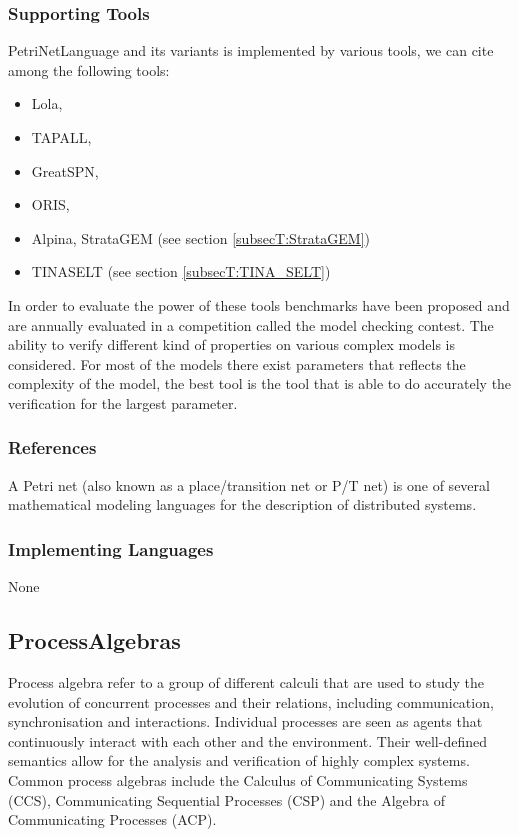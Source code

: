 \subsubsection{Supporting Tools}

PetriNetLanguage and its variants is implemented by various tools, we can cite among the following tools:
\begin{itemize}
	\item Lola,
	\item TAPALL,
	\item GreatSPN,
	\item ORIS,
	\item Alpina, StrataGEM (see section \ref{subsecT:StrataGEM})
	\item TINA\textunderscore SELT (see section \ref{subsecT:TINA_SELT})
\end{itemize}

In order to evaluate the power of these tools benchmarks have been proposed and are annually evaluated in a competition called the model checking contest. \cite{mcc} The ability to verify different kind of properties on various complex models is considered. 
For most of the models there exist parameters that reflects the complexity of the model, the best tool is the tool that is
able to do accurately the verification for the largest parameter.

\subsubsection{References}

A Petri net (also known as a place/transition net or P/T net) is one of several mathematical modeling languages for the description of distributed systems.

\subsubsection{Implementing Languages}

None

\subsection{ProcessAlgebras}
\label{subsecF:ProcessAlgebras}

Process algebra refer to a group of different calculi that are used to study the evolution of concurrent processes and their relations, including communication, synchronisation and interactions.
Individual processes are seen as agents that continuously interact with each other and the environment.
Their well-defined semantics allow for the analysis and verification of highly complex systems. 
Common process algebras include the Calculus of Communicating Systems (CCS), Communicating Sequential Processes (CSP) and the Algebra of Communicating Processes (ACP).


